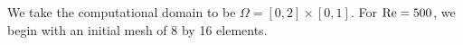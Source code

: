 We take the computational domain to be $\Omega = [0,2]\times[0,1]$. For $\Reyn = 500$, we begin with an initial mesh of 8 by 16 elements. 
\begin{figure}[!h]
\centering
{}

\end{figure}
